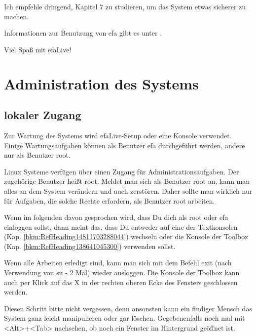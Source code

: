 \documentclass[a4paper,12pt,twoside]{article}
\begin{document}
Ich empfehle dringend, Kapitel 7 zu studieren, um das System etwas
sicherer zu machen.


\bigskip

Informationen zur Benutzung von efa gibt es unter \cite{EFA2}.


\bigskip

Viel Spaß mit efaLive!


\bigskip

\section{Administration des Systems}
\subsection[lokaler Zugang]{lokaler Zugang}
\label{bkm:RefHeading31571728}Zur Wartung des Systems wird efaLive-Setup
oder eine Konsole verwendet. Einige Wartungsaufgaben können als
Benutzer {\textquotedbl}efa{\textquotedbl} durchgeführt werden, andere
nur als Benutzer {\textquotedbl}root{\textquotedbl}.

Linux Systeme verfügen über einen Zugang für Administrationsaufgaben.
Der zugehörige Benutzer heißt {\textquotedbl}root{\textquotedbl}.
Meldet man sich als Benutzer {\textquotedbl}root{\textquotedbl} an,
kann man alles an dem System verändern und auch zerstören. Daher sollte
man wirklich nur für Aufgaben, die solche Rechte erfordern, als
Benutzer {\textquotedbl}root{\textquotedbl} arbeiten.


\bigskip

Wenn im folgenden davon gesprochen wird, dass Du dich als
{\textquotedbl}root{\textquotedbl} oder
{\textquotedbl}efa{\textquotedbl} einloggen sollst, dann meint das,
dass Du entweder auf eine der Textkonsolen (Kap.
\ref{bkm:RefHeading14811703288044}) wechseln oder die Konsole der
Toolbox (Kap. \ref{bkm:RefHeading138641045300}) verwenden sollst.


\bigskip

Wenn alle Arbeiten erledigt sind, kann man sich mit dem Befehl
{\textquotedbl}exit{\textquotedbl} (nach Verwendung von
{\textquotedbl}su -{\textquotedbl} 2 Mal) wieder ausloggen. Die Konsole
der Toolbox kann auch per Klick auf das X in der rechten oberen Ecke
des Fensters geschlossen werden.

Diesen Schritt bitte nicht vergessen, denn ansonsten kann ein findiger
Mensch das System ganz leicht manipulieren oder gar löschen.
Gegebenenfalls noch mal mit
{\textless}Alt{\textgreater}+{\textless}Tab{\textgreater} nachsehen, ob
noch ein Fenster im Hintergrund geöffnet ist.
\end{document}
